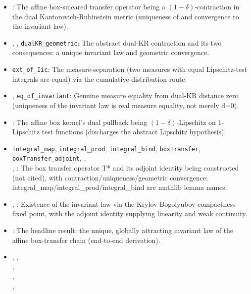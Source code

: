 \begin{itemize}[leftmargin=1.4em,itemsep=1pt]
\item {}: The affine box-smeared transfer operator being a $(1-\delta)$-contraction in the dual Kantorovich-Rubinstein metric (uniqueness of and convergence to the invariant law).
\item {}, , \texttt{dualKR\_geometric}: The abstract dual-KR contraction and its two consequences: a unique invariant law and geometric convergence.
\item \texttt{ext\_of\_Iic}: The measure-separation (two measures with equal Lipschitz-test integrals are equal) via the cumulative-distribution route.
\item {}, \texttt{eq\_of\_invariant}: Genuine measure equality from dual-KR distance zero (uniqueness of the invariant law is real measure equality, not merely d=0).
\item {}: The affine box kernel's dual pullback being $(1-\delta)$-Lipschitz on $1$-Lipschitz test functions (discharges the abstract Lipschitz hypothesis).
\item \texttt{integral\_map}, \texttt{integral\_prod},
\texttt{integral\_bind}, \texttt{boxTransfer},\\
\texttt{boxTransfer\_adjoint}, ,\\
,
: The box transfer operator T* and its adjoint identity being constructed (not cited), with contraction/uniqueness/geometric convergence; integral\_map/integral\_prod/integral\_bind are mathlib lemma names.
\item {}, : Existence of the invariant law via the Krylov-Bogolyubov compactness fixed point, with the adjoint identity supplying linearity and weak continuity.
\item {}: The headline result: the unique, globally attracting invariant law of the affine box-transfer chain (end-to-end derivation).
\item {},
,\\
,\\
,\\
,

\end{itemize}
